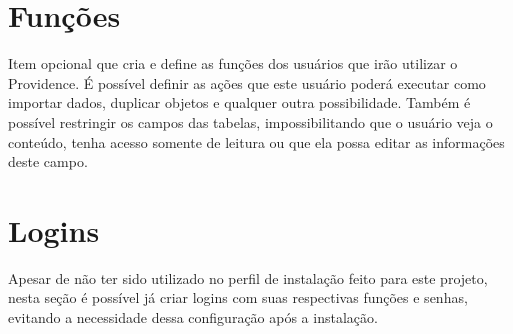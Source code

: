\section{Funções}

Item opcional que cria e define as funções dos usuários que irão utilizar o Providence. É possível definir as ações que este usuário poderá executar como importar dados, duplicar objetos e qualquer outra possibilidade. Também é possível restringir os campos das tabelas, impossibilitando que o usuário veja o conteúdo, tenha acesso somente de leitura ou que ela possa editar as informações deste campo.

\section{Logins}

Apesar de não ter sido utilizado no perfil de instalação feito para este projeto, nesta seção é possível já criar logins com suas respectivas funções e senhas, evitando a necessidade dessa configuração após a instalação.